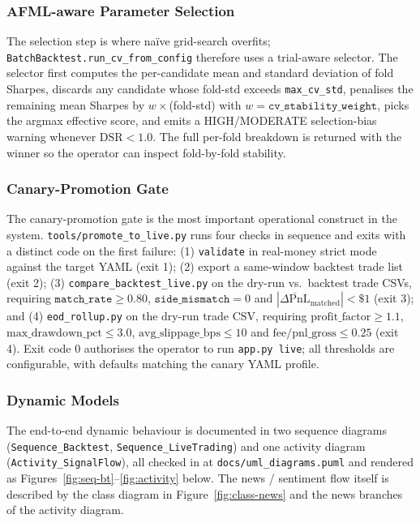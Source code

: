 \documentclass[a4paper, 12pt, titlepage]{article}
\begin{document}
\subsubsection{AFML-aware Parameter Selection}

The selection step is where naïve grid-search overfits;
\texttt{BatchBacktest.run\_cv\_from\_config} therefore uses a
trial-aware selector.
The selector first computes the per-candidate mean and standard
deviation of fold Sharpes, discards any candidate whose fold-std
exceeds \texttt{max\_cv\_std}, penalises the remaining mean Sharpes
by $w$\,$\times$\,(fold-std) with $w =
\texttt{cv\_stability\_weight}$, picks the argmax effective score,
and emits a HIGH/MODERATE selection-bias warning whenever
$\mathrm{DSR}<1.0$. The full per-fold breakdown is returned with
the winner so the operator can inspect fold-by-fold stability.

\subsubsection{Canary-Promotion Gate}

The canary-promotion gate is the most important operational
construct in the system. \texttt{tools/promote\_to\_live.py} runs
four checks in sequence and exits with a distinct code on the
first failure: (1) \texttt{validate} in real-money strict mode
against the target YAML (exit 1); (2) export a same-window
backtest trade list (exit 2); (3) \texttt{compare\_backtest\_live.py}
on the dry-run vs.\ backtest trade CSVs, requiring
$\texttt{match\_rate}\geq 0.80$, $\texttt{side\_mismatch}=0$ and
$|\overline{\Delta\text{PnL}}_\text{matched}|<\$1$ (exit 3); and
(4) \texttt{eod\_rollup.py} on the dry-run trade CSV, requiring
$\text{profit\_factor}\geq 1.1$, $\text{max\_drawdown\_pct}\leq
3.0$, $\text{avg\_slippage\_bps}\leq 10$ and
$\text{fee}/\text{pnl\_gross}\leq 0.25$ (exit 4). Exit code 0
authorises the operator to run \texttt{app.py live}; all
thresholds are configurable, with defaults matching the canary
YAML profile.

\subsubsection{Dynamic Models}

The end-to-end dynamic behaviour is documented in two sequence
diagrams (\texttt{Sequence\_Backtest}, \texttt{Sequence\_LiveTrading})
and one activity diagram (\texttt{Activity\_SignalFlow}), all
checked in at \texttt{docs/uml\_diagrams.puml} and rendered as
Figures~\ref{fig:seq-bt}--\ref{fig:activity} below. The news /
sentiment flow itself is described by the class diagram in
Figure~\ref{fig:class-news} and the news branches of the activity
diagram.
\end{document}
